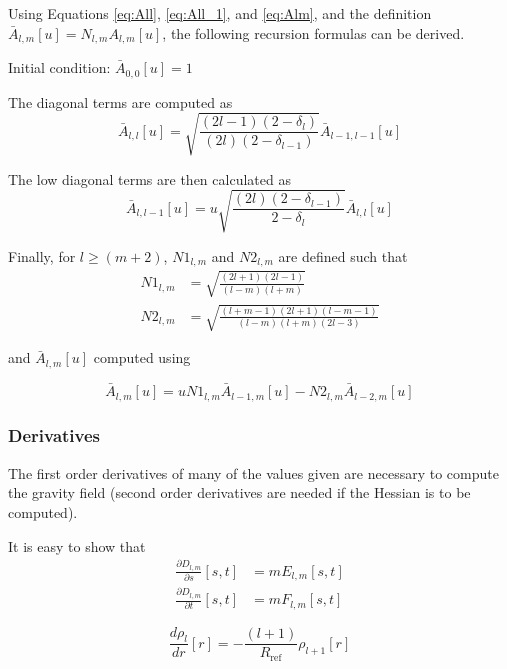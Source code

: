 Using Equations \eqref{eq:All}, \eqref{eq:All_1}, and \eqref{eq:Alm}, and the definition $\bar A_{l,m}[u] = N_{l,m} A_{l,m}[u]$, the following recursion formulas can be derived.

Initial condition: $\bar A_{0,0}[u] = 1$

The diagonal terms are computed as
\begin{equation}
\bar A_{l,l}[u] = \sqrt{\frac{(2 l - 1) (2 - \delta_l)}{(2 l) (2 - \delta_{l-1})}} \bar A_{l-1,l-1}[u]
\end{equation}

The low diagonal terms are then calculated as
\begin{equation}
\bar A_{l,l-1}[u] = u \sqrt{\frac{(2 l) (2 - \delta_{l-1})}{2 - \delta_l}} \bar A_{l,l}[u]
\end{equation}

Finally, for $l \geq (m+2)$, $N1_{l,m}$ and $N2_{l,m}$ are defined such that
\begin{align}
	N1_{l,m} &= \sqrt{\frac{(2 l + 1) (2 l - 1)}{(l - m) (l + m)}}\\
	N2_{l,m} &= \sqrt{\frac{(l + m - 1) (2 l + 1) (l - m -1)}{(l - m) (l + m) (2 l - 3)}}
\end{align}

and $\bar A_{l,m}[u]$ computed using

\begin{equation}
\bar A_{l,m}[u] = u N1_{l,m} \bar A_{l-1,m}[u] - N2_{l,m} \bar A_{l-2,m}[u]
\end{equation}


\subsubsection{Derivatives}

The first order derivatives of many of the values given are necessary to compute the gravity field (second order derivatives are needed if the Hessian is to be computed).

It is easy to show that
\begin{align}
	\frac{\partial D_{l,m}}{\partial s}[s,t] &= m E_{l,m}[s,t]\\
	\frac{\partial D_{l,m}}{\partial t}[s,t] &= m F_{l,m}[s,t]
\end{align}

\begin{equation}
\frac{d \rho_l}{d r}[r] = -\frac{(l+1)}{R_{\text{ref}}} \rho_{l+1}[r]
\end{equation}

